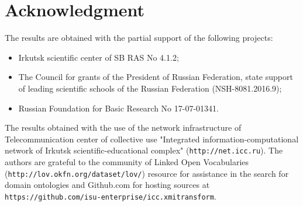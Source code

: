 \documentclass[conference,a4paper]{IEEEtran}
\providecommand\url[1]{\texttt{#1}}
\begin{document}

\section*{Acknowledgment}

The results are obtained with the partial support of the following projects:
\begin{itemize}
\item Irkutsk scientific center of SB RAS No 4.1.2;
\item The Council for grants of the President of Russian Federation, state support of leading scientific schools of the Russian Federation (NSH-8081.2016.9);
\item Russian Foundation for Basic Research No 17-07-01341.
\end{itemize}
The results obtained with the use of the network infrastructure of Telecommunication center of collective use "Integrated information-computational network of Irkutsk scientific-educational complex" (\url{http://net.icc.ru}). The authors are grateful to the community of Linked Open Vocabularies (\url{http://lov.okfn.org/dataset/lov/}) resource for assistance in the search for domain ontologies and Github.com for hosting sources at \url{https://github.com/isu-enterprise/icc.xmitransform}.
\end{document}
